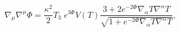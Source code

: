 \begin{equation}
\nabla_\mu\nabla^\mu\Phi =
\frac{\kappa^2}{2}T_3\;e^{3\Phi}V(T)
\frac{3+2e^{-2\Phi}\nabla_\alpha T\nabla^\alpha T}{
\sqrt{1+e^{-2\Phi}\nabla_\alpha T\nabla^\alpha T}},
\label{dilaton9}
\end{equation}


